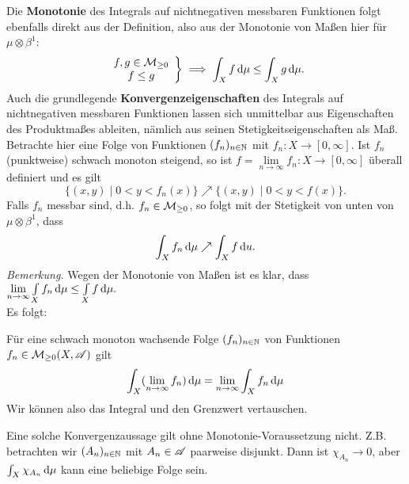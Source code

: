 Die \textbf{Monotonie} des Integrals auf nichtnegativen messbaren Funktionen folgt ebenfalls direkt aus der Definition, also aus der Monotonie von Maßen hier für $\mu\otimes \beta^1$:
\begin{equation*}
{\begin{rcases}
\begin{array}{c}
f,g \in \MM_{\geq 0}\\
f\leq g\end{array}
\end{rcases} \implies
\int_X f \D \mu \leq \int_X g \D \mu.}
\end{equation*}
Auch die grundlegende \textbf{Konvergenzeigenschaften} des Integrals auf nichtnegativen messbaren Funktionen lassen sich unmittelbar aus Eigenschaften des Produktmaßes ableiten, nämlich aus seinen Stetigkeitseigenschaften als Maß. \\
Betrachte hier eine Folge von Funktionen $(f_n)_{n \in \N}$ mit $f_n:X \longrightarrow [0,\infty]$. Ist $f_n$ (punktweise) schwach monoton steigend, so ist $f=\lim\limits_{n\to\infty} f_n :X \longrightarrow [0,\infty]$ überall definiert und es gilt
$$
\{(x,y) \mid 0<y<f_n(x)\} \nearrow \{(x,y) \mid 0<y<f(x)\}.
$$
Falls $f_n$ messbar sind, d.h. $f_n \in \MM_{\geq 0}$, so folgt mit der Stetigkeit von unten von $\mu \otimes \beta^1$, dass 
$$ \int_X f_n \D \mu \nearrow \int_X f \D u.$$
\textit{Bemerkung.} Wegen der Monotonie von Maßen ist es klar, dass $\lim\limits_{n\to\infty} \int\limits_X f_n \D \mu \leq \int\limits_X f \D \mu.$\\ Es folgt:

\begin{satz}
\begin{mdframed}
Für eine schwach \newline monoton wachsende Folge $(f_n)_{n \in \N}$ von Funktionen $f_n \in \MM_{\geq 0}(X,\AA)$ gilt
$$
\int_X (\lim_{n \to \infty} f_n) \D \mu =\lim_{n \to \infty} \int_X f_n \D \mu
$$
Wir können also das Integral und den Grenzwert vertauschen.
\end{mdframed}
\end{satz}

\begin{remark}
Eine solche Konvergenzaussage gilt ohne Monotonie-Voraussetzung nicht. Z.B. betrachten wir $(A_n)_{n \in \N}$ mit $A_n \in \AA$ paarweise disjunkt. Dann ist $\chi_{A_n}\longrightarrow 0$, aber $\int_X \chi_{A_n}\D\mu$ kann eine beliebige Folge sein.
\end{remark}


